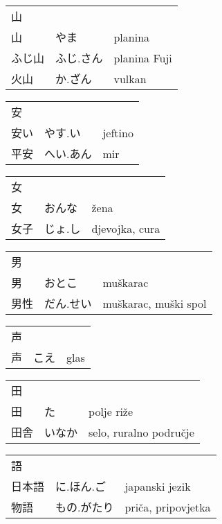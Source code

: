

\newenvironment{dictentry}[1]{
	\begin{tabular}{p{2cm} p{3cm} p{10cm}}
		#1 &&\\
}{
	\end{tabular}
	\vspace{20pt}
}

\newcommand{\example}[3]{
	\hspace*{\fill}#1 & #2 & #3\\
}

\author{ロボット君}


\begin{dictentry}{山}
\example{山}{やま}{planina}
\example{ふじ山}{ふじ.さん}{planina Fuji}
\example{火山}{か.ざん}{vulkan}
\end{dictentry}

\begin{dictentry}{安}
\example{安い}{やす.い}{jeftino}
\example{平安}{へい.あん}{mir}
\end{dictentry}

\begin{dictentry}{女}
\example{女}{おんな}{žena}
\example{女子}{じょ.し}{djevojka, cura}
\end{dictentry}

\begin{dictentry}{男}
\example{男}{おとこ}{muškarac}
\example{男性}{だん.せい}{muškarac, muški spol}
\end{dictentry}

\begin{dictentry}{声}
\example{声}{こえ}{glas}
\end{dictentry}

\begin{dictentry}{田}
\example{田}{た}{polje riže}
\example{田舎}{いなか\footnotemark[1]}{selo, ruralno područje}
\end{dictentry}

\begin{dictentry}{語}
\example{日本語}{に.ほん.ご}{japanski jezik}
\example{物語}{もの.がたり}{priča, pripovjetka}
\end{dictentry}


